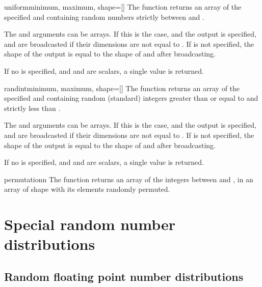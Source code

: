 \begin{funcdesc}{uniform}{minimum, maximum, shape=[]}
   The  function returns an array of the specified
    and containing  random numbers strictly between
    and .
   
   The  and  arguments can be arrays. If this is the
   case, and the output  is specified,  and
    are broadcasted if their dimensions are not equal to
   . If  is not specified, the shape of the output is
   equal to the shape of  and  after broadcasting.
   
   If no  is specified, and  and  are
   scalars, a single value is returned.
\end{funcdesc}

\begin{funcdesc}{randint}{minimum, maximum, shape=[]}
   The  function returns an array of the specified
    and containing random (standard) integers greater than or equal
   to  and strictly less than . 
   
   The  and  arguments can be arrays. If this is the
   case, and the output  is specified,  and
    are broadcasted if their dimensions are not equal to
   . If  is not specified, the shape of the output is
   equal to the shape of  and  after broadcasting.
   
   If no  is specified, and  and  are
   scalars, a single value is returned.
\end{funcdesc}

\begin{funcdesc}{permutation}{n}
   The  function returns an array of the integers between
    and , in an array of shape  with its
   elements randomly permuted.
\end{funcdesc}


\section{Special random number distributions}
\label{sec:RA:special-distribution}



\subsection{Random floating point number distributions}
\label{sec:RA:float-distribution}


